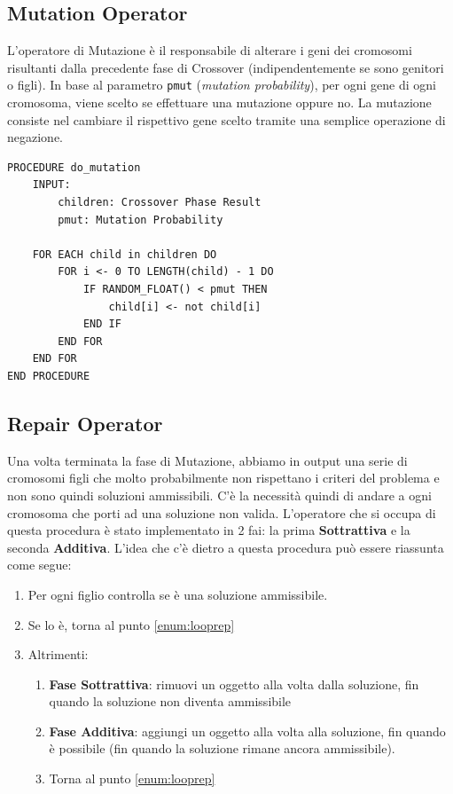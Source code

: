 \subsection{Mutation Operator}

L'operatore di Mutazione è il responsabile di alterare i geni dei cromosomi
risultanti dalla precedente fase di Crossover (indipendentemente se sono
genitori o figli). In base al parametro \verb|pmut| (\textit{mutation
    probability}), per ogni gene di ogni cromosoma, viene scelto se effettuare una
mutazione oppure no. La mutazione consiste nel cambiare il rispettivo gene
scelto tramite una semplice operazione di negazione.

\begin{minipage}{\textwidth}
    \begin{lstlisting}
PROCEDURE do_mutation
    INPUT:
        children: Crossover Phase Result
        pmut: Mutation Probability

    FOR EACH child in children DO
        FOR i <- 0 TO LENGTH(child) - 1 DO
            IF RANDOM_FLOAT() < pmut THEN
                child[i] <- not child[i]
            END IF
        END FOR
    END FOR
END PROCEDURE
\end{lstlisting}
\end{minipage}

\subsection{Repair Operator}

Una volta terminata la fase di Mutazione, abbiamo in output una serie di
cromosomi figli che molto probabilmente non rispettano i criteri del problema e
non sono quindi soluzioni ammissibili. C'è la necessità quindi di andare a
 ogni cromosoma che porti ad una soluzione non valida.
L'operatore che si occupa di questa procedura è stato implementato in 2 fai: la
prima \textbf{Sottrattiva} e la seconda \textbf{Additiva}. L'idea che c'è dietro
a questa procedura può essere riassunta come segue:

\begin{enumerate}
    \item Per ogni figlio controlla se è una soluzione ammissibile.
          \label{enum:looprep}
    \item Se lo è, torna al punto \ref{enum:looprep}
    \item Altrimenti:
          \begin{enumerate}
              \item \textbf{Fase Sottrattiva}: rimuovi un oggetto alla volta
                    dalla soluzione, fin quando la soluzione non diventa ammissibile
              \item \textbf{Fase Additiva}: aggiungi un oggetto alla volta alla
                    soluzione, fin quando è possibile (fin quando la soluzione
                    rimane ancora ammissibile).
              \item Torna al punto \ref{enum:looprep}
          \end{enumerate}
\end{enumerate}


